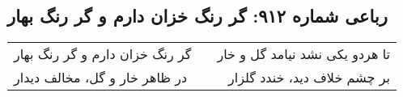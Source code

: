 \begin{center}
\section*{رباعی شماره ۹۱۲: گر رنگ خزان دارم و گر رنگ بهار}
\label{sec:0912}
\begin{longtable}{l p{0.5cm} r}
گر رنگ خزان دارم و گر رنگ بهار
&&
تا هردو یکی نشد نیامد گل و خار
\\
در ظاهر خار و گل، مخالف دیدار
&&
بر چشم خلاف دید، خندد گلزار
\\
\end{longtable}
\end{center}
